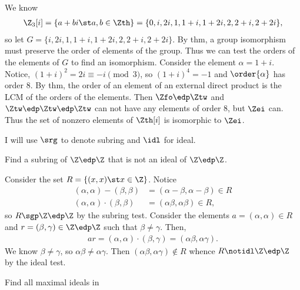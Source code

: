 \documentclass{article}
\begin{document}
\begin{solution} %
  We know \begin{align*}
    \Z_3[i] = \{a+bi \st a,b\in\Zth\} = \{0, i, 2i, 1, 1+i, 1+2i, 2, 2+i, 2+2i\},
  \end{align*}
  so let \( G = \{i, 2i, 1, 1+i, 1+2i, 2, 2+i, 2+2i\} \).
  By thm, a group isomorphism must preserve the order of elements of the group.
  Thus we can test the orders of the elements of \( G \) to find an isomorphism.
  Consider the element \( \alpha=1+i \).
  Notice, \( (1+i)^2 = 2i \equiv -i \pmod 3 \), so \( (1+i)^4 = -1 \) and \( \order{\alpha} \) has order 8.
  By thm, the order of an element of an external direct product is the LCM of the orders of the elements.
  Then \( \Zfo\edp\Ztw \) and \( \Ztw\edp\Ztw\edp\Ztw \) can not have any elements of order 8, but \( \Zei \) can.
  Thus the set of nonzero elements of \( \Zth[i] \) is isomorphic to \( \Zei \).
\end{solution}

\begin{note}[Notation]
  I will use \( \srg \) to denote subring and \( \idl \) for ideal.
\end{note}

Find a subring of \( \Z\edp\Z \) that is not an ideal of \( \Z\edp\Z \).

\begin{solution} %
Consider the set \( R = \{(x,x)\st x\in\Z\} \).
Notice \begin{align}
  (\alpha,\alpha) - (\beta,\beta) &= (\alpha-\beta, \alpha-\beta) \in R \label{srt c1}\\
  (\alpha,\alpha) \cdot (\beta,\beta) &= (\alpha\beta,\alpha\beta) \in R,
\end{align}
so \( R\sgp\Z\edp\Z \) by the subring test. Consider the elements \( a=(\alpha,\alpha)\in R \) and \( r = (\beta, \gamma) \in \Z\edp\Z \) such that \( \beta\neq\gamma \). Then, \begin{align*}
  ar = (\alpha,\alpha)\cdot (\beta,\gamma) = (\alpha\beta, \alpha\gamma).
\end{align*}
We know \( \beta\neq\gamma \), so \( \alpha\beta\neq\alpha\gamma \). Then \( (\alpha\beta,\alpha\gamma) \notin R \) whence \( R\notidl \Z\edp\Z \) by the ideal test.
\end{solution}

Find all maximal ideals in \\
\Zn
\end{document}
